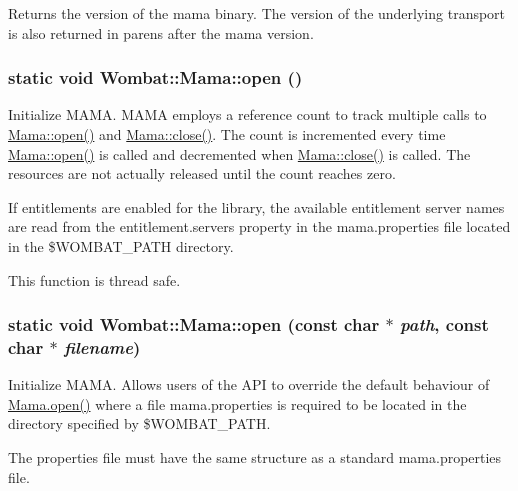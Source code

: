 Returns the version of the mama binary. The version of the underlying transport is also returned in parens after the mama version. \hypertarget{classWombat_1_1Mama_af1fafa88e6e22e7afc37b10de0f5a0d5}{
\subsubsection[{open}]{\setlength{\rightskip}{0pt plus 5cm}static void Wombat::Mama::open ()}}
\label{classWombat_1_1Mama_af1fafa88e6e22e7afc37b10de0f5a0d5}


Initialize MAMA. MAMA employs a reference count to track multiple calls to \hyperlink{classWombat_1_1Mama_af1fafa88e6e22e7afc37b10de0f5a0d5}{Mama::open()} and \hyperlink{classWombat_1_1Mama_aa222cbf76174d7699e8174221832cff4}{Mama::close()}. The count is incremented every time \hyperlink{classWombat_1_1Mama_af1fafa88e6e22e7afc37b10de0f5a0d5}{Mama::open()} is called and decremented when \hyperlink{classWombat_1_1Mama_aa222cbf76174d7699e8174221832cff4}{Mama::close()} is called. The resources are not actually released until the count reaches zero.

If entitlements are enabled for the library, the available entitlement server names are read from the entitlement.servers property in the mama.properties file located in the \$WOMBAT\_\-PATH directory.

This function is thread safe. \hypertarget{classWombat_1_1Mama_a06dbb81b8c854329c37bae4db22d040e}{
\subsubsection[{open}]{\setlength{\rightskip}{0pt plus 5cm}static void Wombat::Mama::open (const char $\ast$ {\em path}, \/  const char $\ast$ {\em filename})}}
\label{classWombat_1_1Mama_a06dbb81b8c854329c37bae4db22d040e}


Initialize MAMA. Allows users of the API to override the default behaviour of \hyperlink{classWombat_1_1Mama_af1fafa88e6e22e7afc37b10de0f5a0d5}{Mama.open()} where a file mama.properties is required to be located in the directory specified by \$WOMBAT\_\-PATH.

The properties file must have the same structure as a standard mama.properties file.

